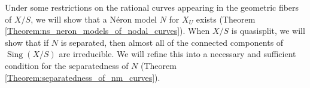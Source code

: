 \documentclass[a4paper,10pt,twoside]{article}
\newcommand{\on}[1]{\operatorname{#1}}
\renewcommand{\O}{\mathcal{O}}
\DeclareMathOperator{\sing}{Sing}
\newtheorem{thm}{Theorem}[section]
\theoremstyle{definition}
\theoremstyle{remark}
\renewcommand{\on}[1]{\operatorname{#1}}
\begin{document}
	Under some restrictions on the rational curves appearing in the geometric fibers of $X/S$, we will show that a Néron model $N$ for $X_U$ exists (Theorem \ref{Theorem:ns_neron_models_of_nodal_curves}). When $X/S$ is quasisplit, we will show that if $N$ is separated, then almost all of the connected components of $\sing(X/S)$ are irreducible. We will refine this into a necessary and sufficient condition for the separatedness of $N$ (Theorem \ref{Theorem:separatedness_of_nm_curves}).



\end{document}
